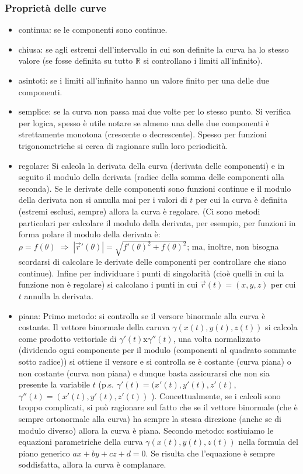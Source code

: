 \subsubsection{Proprietà delle curve}
\begin{itemize}
    \item continua: se le componenti sono continue.
    \item chiusa: se agli estremi dell'intervallo in cui son definite la curva ha lo stesso valore (se fosse definita su tutto $\mathbb{R}$ si controllano i limiti all'infinito).
    \item asintoti: se i limiti all'infinito hanno un valore finito per una delle due componenti.
    \item semplice: se la curva non passa mai due volte per lo stesso punto. Si verifica per logica, spesso è utile notare se almeno una delle due componenti è strettamente monotona (crescente o decrescente). Spesso per funzioni trigonometriche si cerca di ragionare sulla loro periodicità.
    \item regolare: Si calcola la derivata della curva (derivata delle componenti) e in seguito il modulo della derivata (radice della somma delle componenti alla seconda). Se le derivate delle componenti sono funzioni continue e il modulo della derivata non si annulla mai per i valori di $t$ per cui la curva è definita (estremi esclusi, sempre) allora la curva è regolare. (Ci sono metodi particolari per calcolare il modulo della derivata, per esempio, per funzioni in forma polare il modulo della derivata è: $\rho = f(\theta) \; \Rightarrow \; |\vec{r}'(\theta)| = \sqrt{f'(\theta)^2 + f(\theta)^2}$; ma, inoltre, non bisogna scordarsi di calcolare le derivate delle componenti per controllare che siano continue).\newline
    Infine per individuare i punti di singolarità (cioè quelli in cui la funzione non è regolare) si calcolano i punti in cui $\vec{r}(t) = (x,y,z)$ per cui $t$ annulla la derivata.
    \item piana: \newline
    Primo metodo: si controlla se il versore binormale alla curva è costante. Il vettore binormale della caruva $\gamma(x(t), y(t), z(t))$ si calcola come prodotto vettoriale di $\gamma'(t) \text{x} \gamma''(t)$, una volta normalizzato (dividendo ogni componente per il modulo (componenti al quadrato sommate sotto radice)) si ottiene il versore e si controlla se è costante (curva piana) o non costante (curva non piana) e dunque basta assicurarsi che non sia presente la variabile $t$ (p.s. $\gamma'(t) = (x'(t), y'(t), z'(t)$, $\gamma''(t) = (x'(t), y'(t), z'(t))$ ). Concettualmente, se i calcoli sono troppo complicati, si può ragionare sul fatto che se il vettore binormale (che è sempre ortonormale alla curva) ha sempre la stessa direzione (anche se di modulo diverso) allora la curva è piana.\newline
    Secondo metodo: sostiuiamo le equazioni parametriche della curva $\gamma(x(t), y(t), z(t))$ nella formula del piano generico $ax + by +cz + d = 0$. Se risulta che l'equazione è sempre soddisfatta, allora la curva è complanare.
\end{itemize}
\ \newline
